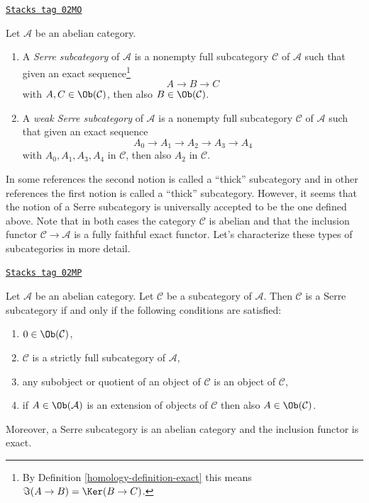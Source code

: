 \begin{definition}
\label{homology-definition-serre-subcategory}
\href{https://stacks.math.columbia.edu/tag/02MO}{\texttt{Stacks tag 02MO}}

\begin{reference}
\cite[Condition (I) on page 259]{Serre_homotopie_classes}
\end{reference}
Let $\mathcal{A}$ be an abelian category.
\begin{enumerate}
\item A {\it Serre subcategory} of $\mathcal{A}$ is a
nonempty full subcategory $\mathcal{C}$ of $\mathcal{A}$
such that given an exact sequence\footnote{By
Definition \ref{homology-definition-exact} this means $\Im(A \to B) = \Ker(B \to C)$.}
$$
A \to B \to C
$$
with $A, C \in \Ob(\mathcal{C})$, then also
$B \in \Ob(\mathcal{C})$.
\item A {\it weak Serre subcategory} of $\mathcal{A}$ is a nonempty
full subcategory $\mathcal{C}$ of $\mathcal{A}$ such that given an
exact sequence
$$
A_0 \to A_1 \to A_2 \to A_3 \to A_4
$$
with $A_0, A_1, A_3, A_4$ in $\mathcal{C}$, then also $A_2$ in $\mathcal{C}$.
\end{enumerate}
\end{definition}

In some references the second notion is called a ``thick'' subcategory
and in other references the first notion is called a ``thick'' subcategory.
However, it seems that the notion of a Serre subcategory is universally
accepted to be the one defined above. Note that in both cases the category
$\mathcal{C}$ is abelian and that the inclusion functor
$\mathcal{C} \to \mathcal{A}$ is a fully faithful exact functor.
Let's characterize these types of subcategories in more detail.

\begin{lemma}
\label{homology-lemma-characterize-serre-subcategory}
\href{https://stacks.math.columbia.edu/tag/02MP}{\texttt{Stacks tag 02MP}}

Let $\mathcal{A}$ be an abelian category.
Let $\mathcal{C}$ be a subcategory of $\mathcal{A}$.
Then $\mathcal{C}$ is a Serre subcategory if and only if
the following conditions are satisfied:
\begin{enumerate}
\item $0 \in \Ob(\mathcal{C})$,
\item $\mathcal{C}$ is a strictly full subcategory of $\mathcal{A}$,
\item any subobject or quotient of an object of $\mathcal{C}$ is an object
of $\mathcal{C}$,
\item if $A \in \Ob(\mathcal{A})$ is an extension of objects of $\mathcal{C}$
then also $A \in \Ob(\mathcal{C})$.
\end{enumerate}
Moreover, a Serre subcategory is an abelian category and
the inclusion functor is exact.
\end{lemma}

